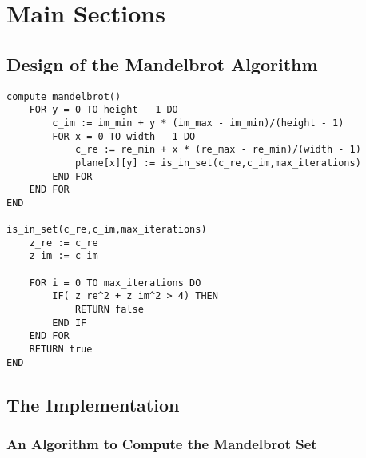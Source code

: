 \chapter{Main Sections}

\section{Design of the Mandelbrot Algorithm}

\begin{lstlisting}[label = li:mandelalgo, caption = A sequential algorithm to compute the Mandelbrot Set presented in pseudo code.]
compute_mandelbrot()
    FOR y = 0 TO height - 1 DO
        c_im := im_min + y * (im_max - im_min)/(height - 1)
        FOR x = 0 TO width - 1 DO
            c_re := re_min + x * (re_max - re_min)/(width - 1)
            plane[x][y] := is_in_set(c_re,c_im,max_iterations)
        END FOR
    END FOR
END

is_in_set(c_re,c_im,max_iterations)
    z_re := c_re
    z_im := c_im

    FOR i = 0 TO max_iterations DO
        IF( z_re^2 + z_im^2 > 4) THEN
            RETURN false
        END IF
    END FOR
    RETURN true 
END

\end{lstlisting}

\section{The Implementation}

\subsection{An Algorithm to Compute the Mandelbrot Set}


